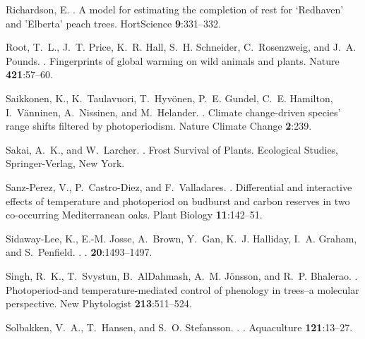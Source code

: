 \documentclass{article}
\begin{document}
\begin{thebibliography}{131}
Richardson, E.
.
\newblock A model for estimating the completion of rest for {`Redhaven' and
  'Elberta'} peach trees.
\newblock HortScience {\bf 9}:331--332.

Root, T.~L., J.~T. Price, K.~R. Hall, S.~H. Schneider, C.~Rosenzweig, and J.~A.
  Pounds.
.
\newblock Fingerprints of global warming on wild animals and plants.
\newblock Nature {\bf 421}:57--60.

Saikkonen, K., K.~Taulavuori, T.~Hyv{\"o}nen, P.~E. Gundel, C.~E. Hamilton,
  I.~V{\"a}nninen, A.~Nissinen, and M.~Helander.
.
\newblock Climate change-driven species' range shifts filtered by
  photoperiodism.
\newblock Nature Climate Change {\bf 2}:239.

Sakai, A.~K., and W.~Larcher.
.
\newblock Frost Survival of Plants.
\newblock Ecological Studies, Springer-Verlag, New York.

Sanz-Perez, V., P.~Castro-Diez, and F.~Valladares.
.
\newblock Differential and interactive effects of temperature and photoperiod
  on budburst and carbon reserves in two co-occurring {M}editerranean oaks.
\newblock Plant Biology {\bf 11}:142--51.

Sidaway-Lee, K., E.-M. Josse, A.~Brown, Y.~Gan, K.~J. Halliday, I.~A. Graham,
  and S.~Penfield.
.
.
 {\bf 20}:1493--1497.

Singh, R.~K., T.~Svystun, B.~AlDahmash, A.~M. J{\"o}nsson, and R.~P. Bhalerao.
.
\newblock Photoperiod-and temperature-mediated control of phenology in trees--a
  molecular perspective.
\newblock New Phytologist {\bf 213}:511--524.

Solbakken, V.~A., T.~Hansen, and S.~O. Stefansson.
.
.
\newblock Aquaculture {\bf 121}:13--27.


\end{thebibliography}
\end{document}
